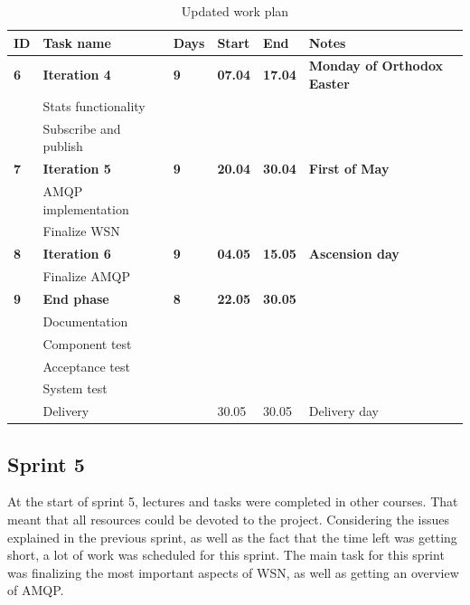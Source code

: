 \begin{center}
\begin{table}[ht!]
\centering
\small
\begin{tabular}{ | m{0.4cm} | m{3.3cm}| m{0.7cm} | m{0.9cm} | m{0.9cm}| m{4.4cm} |} 
\hline
\rowcolor{lightgray}
\textbf{ID} & \textbf{Task name} & \textbf{Days} & \textbf{Start} & \textbf{End} & \textbf{Notes} \\
\hline
\textbf{6} & \textbf{Iteration 4} & \textbf{9} & \textbf{07.04} & \textbf{17.04} & \textbf{Monday of Orthodox Easter} \\
 & Stats functionality & & & & \\
 & Subscribe and publish  & & & & \\
\hline
\textbf{7} & \textbf{Iteration 5} & \textbf{9} & \textbf{20.04} & \textbf{30.04} & \textbf{First of May} \\
 & AMQP implementation & & & & \\
 & Finalize WSN & & & & \\
\hline 
\textbf{8} & \textbf{Iteration 6} & \textbf{9} & \textbf{04.05} & \textbf{15.05} & \textbf{Ascension day} \\
 & Finalize AMQP & & & & \\
\hline
\textbf{9} & \textbf{End phase} & \textbf{8} & \textbf{22.05} & \textbf{30.05} & \\
 & Documentation & & & & \\
 & Component test & & & & \\
 & Acceptance test & & & & \\
 & System test & & & & \\
 & Delivery & & 30.05 & 30.05 & Delivery day \\
\hline
\end{tabular}
\caption{Updated work plan}
\label{tab:workplan, revised}
\end{table}
\end{center}

\subsection{Sprint 5}
\label{subsec:project_lifecycle-development-sprint_5}
At the start of sprint 5, lectures and tasks were completed in other courses. That meant that all resources could be devoted to the project. Considering the issues explained in the previous sprint, as well as the fact that the time left was getting short, a lot of work was scheduled for this sprint. The main task for this sprint was finalizing the most important aspects of WSN, as well as getting an overview of AMQP.

